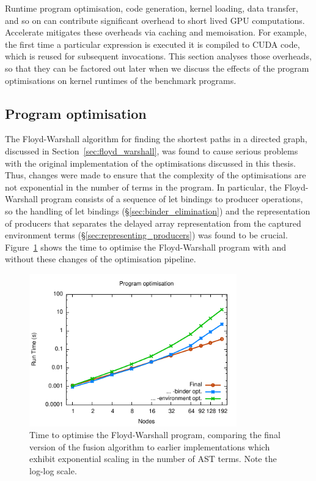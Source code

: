 Runtime program optimisation, code generation, kernel loading, data transfer,
and so on can contribute significant overhead to short lived GPU computations.
Accelerate mitigates these overheads via caching and memoisation. For example,
the first time a particular expression is executed it is compiled to CUDA code,
which is reused for subsequent invocations. This section analyses those
overheads, so that they can be factored out later when we discuss the effects of
the program optimisations on kernel runtimes of the benchmark programs.


\subsection{Program optimisation}



The Floyd-Warshall algorithm for finding the shortest paths in a directed graph,
discussed in Section~\ref{sec:floyd_warshall}, was found to cause serious
problems with the original implementation of the optimisations discussed in this
thesis. Thus, changes were made to ensure that the complexity of the
optimisations are not exponential in the number of terms in the program. In
particular, the Floyd-Warshall program consists of a sequence of let bindings to
producer operations, so the handling of let bindings
(\S\ref{sec:binder_elimination}) and the representation of producers that
separates the delayed array representation from the captured environment terms
(\S\ref{sec:representing_producers}) was found to be crucial.
Figure~\ref{fig:convertAcc} shows the time to optimise the Floyd-Warshall
program with and without these changes of the optimisation pipeline.

\begin{figure}
    \begin{center}
        \includegraphics[width=0.8\textwidth]{images/sec-6/convertAcc/convertAcc}
    \end{center}
    \caption[Program optimisation runtimes]{Time to optimise the Floyd-Warshall
        program, comparing the final version of the fusion algorithm to earlier
        implementations which exhibit exponential scaling in the number of AST
        terms. Note the log-log scale.}
    \label{fig:convertAcc}
\end{figure}


